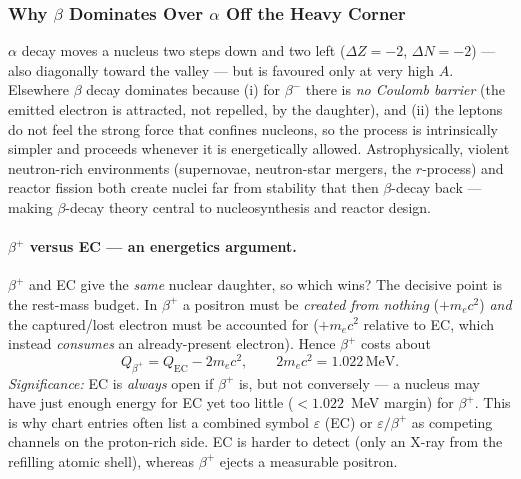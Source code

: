 
\subsubsection*{Why $\beta$ Dominates Over $\alpha$ Off the Heavy Corner}
$\alpha$ decay moves a nucleus two steps down and two left ($\Delta Z=-2$,
$\Delta N=-2$) --- also diagonally toward the valley --- but is favoured only at
very high $A$. Elsewhere $\beta$ decay dominates because (i) for $\beta^-$ there
is \emph{no Coulomb barrier} (the emitted electron is attracted, not repelled, by
the daughter), and (ii) the leptons do not feel the strong force that confines
nucleons, so the process is intrinsically simpler and proceeds whenever it is
energetically allowed. Astrophysically, violent neutron-rich environments
(supernovae, neutron-star mergers, the $r$-process) and reactor fission both
create nuclei far from stability that then $\beta$-decay back --- making
$\beta$-decay theory central to nucleosynthesis and reactor design.

\paragraph{$\beta^+$ versus EC --- an energetics argument.}
$\beta^+$ and EC give the \emph{same} nuclear daughter, so which wins? The
decisive point is the rest-mass budget. In $\beta^+$ a positron must be
\emph{created from nothing} ($+m_ec^2$) \emph{and} the captured/lost electron must
be accounted for ($+m_ec^2$ relative to EC, which instead \emph{consumes} an
already-present electron). Hence $\beta^+$ costs about
\begin{equation}
  \label{eq:lec09:bplus_vs_ec}
  \boxed{Q_{\beta^+} = Q_{\text{EC}} - 2m_ec^2,
  \qquad 2m_ec^2 = 1.022\,\text{MeV}.}
\end{equation}
\textit{Significance:} EC is \emph{always} open if $\beta^+$ is, but not
conversely --- a nucleus may have just enough energy for EC yet too little
($<1.022$~MeV margin) for $\beta^+$. This is why chart entries often list a
combined symbol $\varepsilon$ (EC) or $\varepsilon/\beta^+$ as competing channels
on the proton-rich side. EC is harder to detect (only an X-ray from the refilling
atomic shell), whereas $\beta^+$ ejects a measurable positron.

